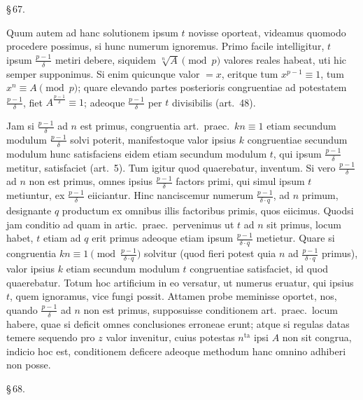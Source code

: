 \documentclass[12pt,a4paper]{article}
\theoremstyle{plain}
\theoremstyle{definition}
\theoremstyle{remark}
\begin{document}
\begin{center}\S\,67.\end{center}

Quum autem ad hanc solutionem ipsum $t$ novisse oporteat, videamus quomodo procedere possimus, si hunc numerum ignoremus. Primo facile intelligitur, $t$ ipsum $\frac{p-1}{\delta}$ metiri debere, siquidem $\sqrt[n]{A} \pmod{p}$ valores reales habeat, uti hic semper supponimus. Si enim quicunque valor $= x$, eritque tum $x^{p-1} \equiv 1$, tum $x^n \equiv A \pmod{p}$; quare elevando partes posterioris congruentiae ad potestatem $\frac{p-1}{\delta}$, fiet $A^{\frac{p-1}{\delta}} \equiv 1$; adeoque $\frac{p-1}{\delta}$ per $t$ divisibilis (art.~48).

Jam si $\frac{p-1}{\delta}$ ad $n$ est primus, congruentia art.\ praec.\ $kn \equiv 1$ etiam secundum modulum $\frac{p-1}{\delta}$ solvi poterit, manifestoque valor ipsius $k$ congruentiae secundum modulum hunc satisfaciens eidem etiam secundum modulum $t$, qui ipsum $\frac{p-1}{\delta}$ metitur, satisfaciet (art.~5). Tum igitur quod quaerebatur, inventum. Si vero $\frac{p-1}{\delta}$ ad $n$ non est primus, omnes ipsius $\frac{p-1}{\delta}$ factors primi, qui simul ipsum $t$ metiuntur, ex $\frac{p-1}{\delta}$ eiiciantur. Hinc nanciscemur numerum $\frac{p-1}{\delta \cdot q}$, ad $n$ primum, designante $q$ productum ex omnibus illis factoribus primis, quos eiicimus. Quodsi jam conditio ad quam in artic.\ praec.\ pervenimus ut $t$ ad $n$ sit primus, locum habet, $t$ etiam ad $q$ erit primus adeoque etiam ipsum $\frac{p-1}{\delta \cdot q}$ metietur. Quare si congruentia $kn \equiv 1 \pmod{\frac{p-1}{\delta \cdot q}}$ solvitur (quod fieri potest quia $n$ ad $\frac{p-1}{\delta \cdot q}$ primus), valor ipsius $k$ etiam secundum modulum $t$ congruentiae satisfaciet, id quod quaerebatur. Totum hoc artificium in eo versatur, ut numerus eruatur, qui ipsius $t$, quem ignoramus, vice fungi possit. Attamen probe meminisse oportet, nos, quando $\frac{p-1}{\delta}$ ad $n$ non est primus, supposuisse conditionem art.\ praec.\ locum habere, quae si deficit omnes conclusiones erroneae erunt; atque si regulas datas temere sequendo pro $z$ valor invenitur, cuius potestas $n^\text{ta}$ ipsi $A$ non sit congrua, indicio hoc est, conditionem deficere adeoque methodum hanc omnino adhiberi non posse.

\begin{center}\S\,68.\end{center}
\end{document}
